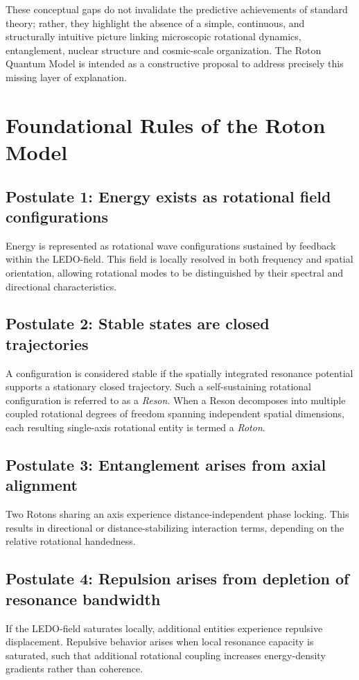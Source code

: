 \documentclass[11pt,a4paper]{article}
\begin{document}
\medskip

These conceptual gaps do not invalidate the predictive achievements of standard theory; rather, they highlight the absence of a simple, continuous, and structurally intuitive picture linking microscopic rotational dynamics, entanglement, nuclear structure and cosmic-scale organization. The Roton Quantum Model is intended as a constructive proposal to address precisely this missing layer of explanation.





\section{Foundational Rules of the Roton Model}

\subsection{Postulate 1: Energy exists as rotational field configurations}
Energy is represented as rotational wave configurations sustained by feedback within the LEDO-field. This field is locally resolved in both frequency and spatial orientation, allowing rotational modes to be distinguished by their spectral and directional characteristics.

\subsection{Postulate 2: Stable states are closed trajectories}
A configuration is considered stable if the spatially integrated resonance potential supports a stationary closed trajectory. Such a self-sustaining rotational configuration is referred to as a \emph{Reson}. When a Reson decomposes into multiple coupled rotational degrees of freedom spanning independent spatial dimensions, each resulting single-axis rotational entity is termed a \emph{Roton}.

\subsection{Postulate 3: Entanglement arises from axial alignment}
Two Rotons sharing an axis experience distance-independent phase locking. This results in directional or distance-stabilizing interaction terms, depending on the relative rotational handedness.

\subsection{Postulate 4: Repulsion arises from depletion of resonance bandwidth}
If the LEDO-field saturates locally, additional entities experience repulsive displacement. Repulsive behavior arises when local resonance capacity is saturated, such that additional rotational coupling increases energy-density gradients rather than coherence.
\end{document}
